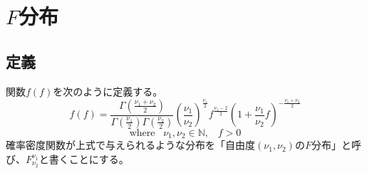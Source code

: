 \chapter{\texorpdfstring{$F$}{F}分布}
    \section{定義}
        \begin{shadebox}
            関数$f(f)$を次のように定義する。
            \[f(f) = \frac{\Gamma{\left(\frac{\nu_1+\nu_2}{2}\right)}}{\Gamma{\left(\frac{\nu_1}{2}\right)}\Gamma{\left(\frac{\nu_2}{2}\right)}}\left(\frac{\nu_1}{\nu_2}\right)^{\frac{\nu_1}{2}}f^{\frac{\nu_1-2}{2}}\left(1+\frac{\nu_1}{\nu_2}f\right)^{-\frac{\nu_1+\nu_2}{2}}\]
            \[\text{where} \hspace{10pt} \nu_1,\nu_2 \in \mathbb{N},\;\;\; f > 0\]
            確率密度関数が上式で与えられるような分布を「自由度$(\nu_1,\nu_2)$の$F$分布」と呼び、$F_{\nu_2}^{\nu_1}$と書くことにする。
        \end{shadebox}
